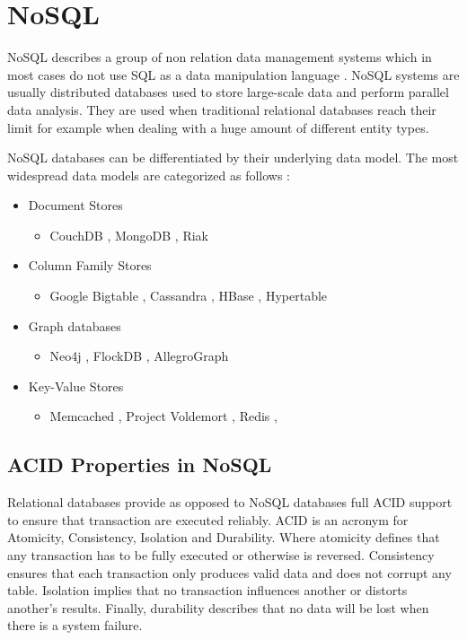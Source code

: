 \section{NoSQL}
\label{sec:nosql}
\acf{NoSQL} describes a group of non relation data management systems which in most cases do not use \acf{SQL} as a data manipulation language \cite[1]{moniruzzaman.2013}. \ac{NoSQL} systems are usually distributed databases used to store large-scale data and perform parallel data analysis. They are used when traditional relational databases reach their limit for example when dealing with a huge amount of different entity types. \cite[1 - 2]{moniruzzaman.2013} \cite[23]{orend.2010}

NoSQL databases can be differentiated by their underlying data model. The most widespread data models are categorized as follows \cite[34]{ellis.2010} \cite[2 - 3]{hecht.2011}:

\begin{itemize}
  \item Document Stores
    \begin{itemize}
      \item CouchDB \cite{couch.2014}, MongoDB \cite{mongo.2014}, Riak \cite{riak.2014}
    \end{itemize}
  \item Column Family Stores
    \begin{itemize}
      \item Google Bigtable \cite{chang.2006}, Cassandra \cite{cassandra.2014}, HBase \cite{hbase.2014}, Hypertable \cite{hypertable.2014}
    \end{itemize}
  \item Graph databases
    \begin{itemize}
      \item Neo4j \cite{neo4j.2014}, FlockDB \cite{flock.2010}, AllegroGraph \cite{allegro.2014}
    \end{itemize}
  \item Key-Value Stores
    \begin{itemize}
      \item Memcached \cite{memcached.2014}, Project Voldemort \cite{voldemort.2013}, Redis \cite{redis.2014}, 
    \end{itemize}
\end{itemize}

\subsection{ACID Properties in NoSQL}
\label{subsec:acid}
Relational databases provide as opposed to \ac{NoSQL} databases full ACID support to ensure that transaction are executed reliably. ACID is an acronym for Atomicity, Consistency, Isolation and Durability. Where atomicity defines that any transaction has to be fully executed or otherwise is reversed. Consistency ensures that each transaction only produces valid data and does not corrupt any table. Isolation implies that no transaction influences another or distorts another's results. Finally, durability describes that no data will be lost when there is a system failure. \cite[71]{pokorny.2011}


